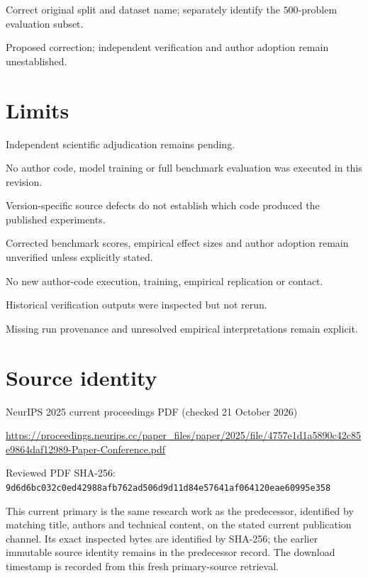 \documentclass[11pt]{article}
\begin{document}
Correct original split and dataset name; separately identify the \(500\)-problem evaluation subset.

Proposed correction; independent verification and author adoption remain unestablished.

\section*{Limits}

Independent scientific adjudication remains pending.\par

No author code, model training or full benchmark evaluation was executed in this revision.\par

Version-specific source defects do not establish which code produced the published experiments.\par

Corrected benchmark scores, empirical effect sizes and author adoption remain unverified unless explicitly stated.\par

No new author-code execution, training, empirical replication or contact.\par

Historical verification outputs were inspected but not rerun.\par

Missing run provenance and unresolved empirical interpretations remain explicit.\par

\section*{Source identity}

NeurIPS 2025 current proceedings PDF (checked 21 October 2026)

\url{https://proceedings.neurips.cc/paper_files/paper/2025/file/4757e1d1a5890c42c85e9864daf12989-Paper-Conference.pdf}

Reviewed PDF SHA-256: \nolinkurl{9d6d6bc032c0ed42988afb762ad506d9d11d84e57641af064120eae60995e358}

This current primary is the same research work as the predecessor, identified by matching title, authors and technical content, on the stated current publication channel. Its exact inspected bytes are identified by SHA-256; the earlier immutable source identity remains in the predecessor record. The download timestamp is recorded from this fresh primary-source retrieval.
\end{document}
